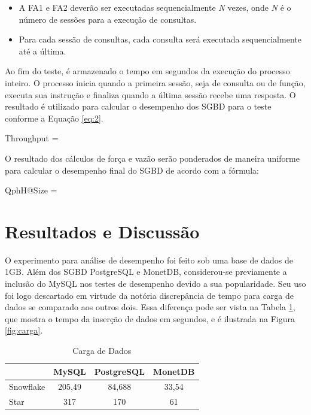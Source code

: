 \documentclass[conference]{IEEEtran}
\begin{document}
\begin{itemize}
	\item A FA1 e FA2 deverão ser executadas sequencialmente \textit{N} vezes, onde \textit{N} é o número de sessões para a execução de consultas.
	\item Para cada sessão de consultas, cada consulta será executada sequencialmente até a última.
\end{itemize}

Ao fim do teste, é armazenado o tempo em segundos da execução do processo inteiro. O processo inicia quando a primeira sessão, seja de consulta ou de função, executa sua instrução e finaliza quando a última sessão recebe uma resposta. O resultado é utilizado para calcular o desempenho dos SGBD para o teste conforme a Equação \ref{eq:2}.

\begin{myequation}%
\label{eq:2}
{\scriptstyle Throughput} =  %
\end{myequation}
%

O resultado dos cálculos de força e vazão serão ponderados de maneira uniforme para calcular o desempenho final do SGBD de acordo com a fórmula:

\begin{myequation}%
\label{eq:3}
{ \scriptstyle QphH@Size =  } %
\end{myequation}
%

\section{Resultados e Discussão}

O experimento para análise de desempenho foi feito sob uma base de dados de 1GB. Além dos SGBD PostgreSQL e MonetDB, considerou-se previamente a inclusão do MySQL nos testes de desempenho devido a sua popularidade. Seu uso foi logo descartado em virtude da notória discrepância de tempo para carga de dados se comparado aos outros dois. Essa diferença pode ser vista na Tabela \ref{tab:carga}, que mostra o tempo da inserção de dados em segundos, e é ilustrada na Figura \ref{fig:carga}.


\begin{table}[htpb]
\centering
\caption{Carga de Dados}
\label{tab:carga}
\begin{tabular}{@{}lccc@{}}
\toprule
          & MySQL  & PostgreSQL & MonetDB \\ \midrule
Snowflake & 205,49 & 84,688     & 33,54   \\
Star      & 317    & 170        & 61      \\ \bottomrule
\end{tabular}
\end{table}
\end{document}
